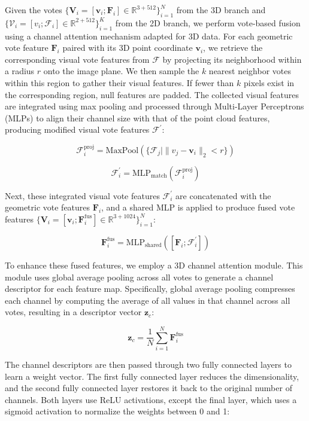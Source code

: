 Given the votes \(\{\mathbf{V}_i = [\mathbf{v}_i; \mathbf{F}_i] \in \mathbb{R}^{3+512}\}_{i=1}^{N}\) from the 3D branch and \(\{\mathcal{V}_i = [v_i; \mathcal{F}_i] \in \mathbb{R}^{2+512}\}_{i=1}^{K}\) from the 2D branch, we perform vote-based fusion using a channel attention mechanism adapted for 3D data. For each geometric vote feature \(\mathbf{F}_i\) paired with its 3D point coordinate \(\mathbf{v}_i\), we retrieve the corresponding visual vote features from \(\mathcal{F}\) by projecting its neighborhood within a radius \(r\) onto the image plane. We then sample the \(k\) nearest neighbor votes within this region to gather their visual features. If fewer than \(k\) pixels exist in the corresponding region, null features are padded. The collected visual features are integrated using max pooling and processed through Multi-Layer Perceptrons (MLPs) to align their channel size with that of the point cloud features, producing modified visual vote features \(\mathcal{F}^{'}\):

\[
\mathcal{F}_i^{\text{proj}} = \text{MaxPool}(\{\mathcal{F}_j \mid \| v_j - \mathbf{v}_i \|_2 < r \})
\]

\[
\mathcal{F}_i^{'} = \text{MLP}_{\text{match}}(\mathcal{F}_i^{\text{proj}})
\]

\noindent Next, these integrated visual vote features \(\mathcal{F}_i^{'}\) are concatenated with the geometric vote features \(\mathbf{F}_i\), and a shared MLP is applied to produce fused vote features \(\{\mathbf{V}_i = [\mathbf{v}_i; \mathbf{F}_i^{\text{fus}}] \in \mathbb{R}^{3+1024}\}_{i=1}^{N}\):

\[
\mathbf{F}_i^{\text{fus}} = \text{MLP}_{\text{shared}}([\mathbf{F}_i; \mathcal{F}_i^{'}])
\]

\noindent To enhance these fused features, we employ a 3D channel attention module. This module uses global average pooling across all votes to generate a channel descriptor for each feature map. Specifically, global average pooling compresses each channel by computing the average of all values in that channel across all votes, resulting in a descriptor vector \(\mathbf{z}_c\):

\[
\mathbf{z}_c = \frac{1}{N} \sum_{i=1}^{N} \mathbf{F}^{\text{fus}}_i
\]

\noindent The channel descriptors are then passed through two fully connected layers to learn a weight vector. The first fully connected layer reduces the dimensionality, and the second fully connected layer restores it back to the original number of channels. Both layers use ReLU activations, except the final layer, which uses a sigmoid activation to normalize the weights between 0 and 1:

